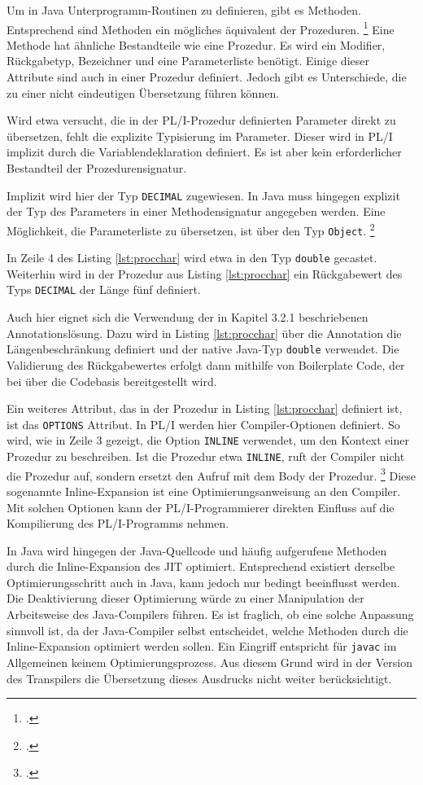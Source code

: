 Um in Java Unterprogramm-Routinen zu definieren, gibt es Methoden. 
Entsprechend sind Methoden ein mögliches äquivalent der Prozeduren. \footcite[Vgl. ][]{oracle}
Eine Methode hat ähnliche Bestandteile wie eine Prozedur.
Es wird ein Modifier, Rückgabetyp, Bezeichner und eine Parameterliste benötigt.
Einige dieser Attribute sind auch in einer Prozedur definiert.
Jedoch gibt es Unterschiede, die zu einer nicht eindeutigen Übersetzung führen können.

Wird etwa versucht, die in der PL/I-Prozedur definierten Parameter direkt zu übersetzen, fehlt die explizite Typisierung im Parameter. Dieser wird in PL/I implizit durch die Variablendeklaration definiert.
Es ist aber kein erforderlicher Bestandteil der Prozedurensignatur. 

Implizit wird hier der Typ \verb+DECIMAL+ zugewiesen. 
In Java muss hingegen explizit der Typ des Parameters in einer Methodensignatur angegeben werden.
Eine Möglichkeit, die Parameterliste zu übersetzen, ist über den Typ \verb+Object+. \footcite[Vgl. ][]{objectdocs}

In Zeile 4 des Listing \ref{lst:procchar} wird etwa in den Typ \verb+double+ gecastet. Weiterhin wird in der Prozedur aus Listing \ref{lst:procchar} ein Rückgabewert des Typs \verb+DECIMAL+ der L\"ange f\"unf definiert.

Auch hier eignet sich die Verwendung der in Kapitel 3.2.1 beschriebenen Annotationslösung. Dazu wird in Listing \ref{lst:procchar} über die Annotation die Längenbeschränkung definiert und der native Java-Typ \verb+double+ verwendet.
Die Validierung des Rückgabewertes erfolgt dann mithilfe von Boilerplate Code, der bei über die Codebasis bereitgestellt wird.

Ein weiteres Attribut, das in der Prozedur in Listing \ref{lst:procchar} definiert ist, ist das \verb+OPTIONS+
Attribut.
In PL/I werden hier Compiler-Optionen definiert. So wird, wie in Zeile 3 gezeigt, die Option \verb+INLINE+ verwendet, um den Kontext einer Prozedur zu beschreiben. Ist die Prozedur etwa \verb+INLINE+, ruft der Compiler nicht die Prozedur auf, sondern ersetzt den Aufruf mit dem Body der Prozedur. \footcite[Vgl.][]{optionsstmt} Diese sogenannte Inline-Expansion ist eine Optimierungsanweisung an den Compiler. Mit solchen Optionen kann der PL/I-Programmierer direkten Einfluss auf die Kompilierung des PL/I-Programms nehmen.

In Java wird hingegen der Java-Quellcode und häufig aufgerufene Methoden durch die Inline-Expansion des \ac{JIT} optimiert. Entsprechend existiert derselbe Optimierungsschritt auch in Java, kann jedoch nur bedingt beeinflusst werden. Die Deaktivierung dieser Optimierung würde zu einer Manipulation der Arbeitsweise des Java-Compilers führen. Es ist fraglich, ob eine solche Anpassung sinnvoll ist, da der Java-Compiler selbst entscheidet, welche Methoden durch die Inline-Expansion optimiert werden sollen. Ein Eingriff entspricht für \verb+javac+ im Allgemeinen keinem Optimierungsprozess.
Aus diesem Grund wird in der Version des Transpilers die Übersetzung dieses Ausdrucks nicht weiter berücksichtigt.

